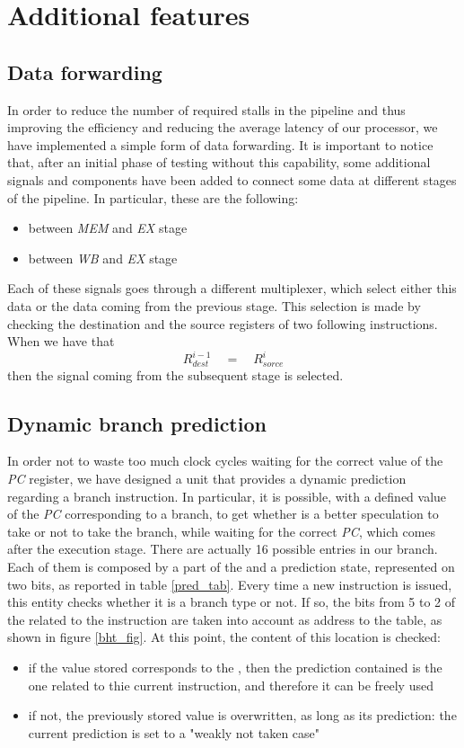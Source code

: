 \chapter{Additional features}
\label{chap_add_feat}

\section{Data forwarding}
In order to reduce the number of required stalls in the pipeline and thus improving the efficiency and reducing the average latency of our processor, we have implemented a simple form of data forwarding.
It is important to notice that, after an initial phase of testing without this capability, some additional signals and components have been added to connect some data at different stages of the pipeline. In particular, these are the following:
\begin{itemize}
	\item between \textit{MEM} and \textit{EX} stage
	\item between \textit{WB} and \textit{EX} stage
\end{itemize}

Each of these signals goes through a different multiplexer, which select either this data or the data coming from the previous stage. This selection is made by checking the destination and the source registers of two following instructions. When we have that
\[R^{i-1}_{dest}\quad = \quad R^{i}_{sorce}\]
then the signal coming from the subsequent stage is selected.


\section{Dynamic branch prediction}
\label{dyn_br}
In order not to waste too much clock cycles waiting for the correct value of the \textit{PC} register, we have designed a unit that provides a dynamic prediction regarding a branch instruction. In particular, it is possible, with a defined value of the \textit{PC} corresponding to a branch, to get whether is a better speculation to take or not to take the branch, while waiting for the correct \textit{PC}, which comes after the execution stage. 
There are actually 16 possible entries in our branch. Each of them is composed 
by a part of the \pc and a prediction state, represented on two bits, as 
reported in table \ref{pred_tab}. Every time a new instruction is issued, this 
entity checks whether it is a branch type or not. If so, the bits from 5 to 2 
of the \pc related to the instruction are taken into account as address to the 
table, as shown in figure \ref{bht_fig}. At this point, the content of this 
location is checked:
\begin{itemize}
	\item if the value stored corresponds to the \pc, then the prediction contained is the one related to thie current instruction, and therefore it can be freely used
	\item if not, the previously stored value is overwritten, as long as its prediction: the current prediction is set to a "weakly not taken case"
\end{itemize}

